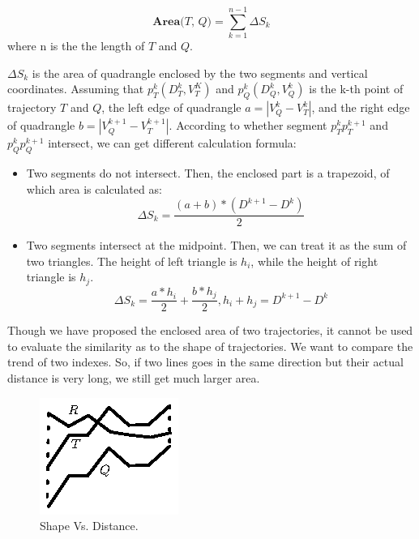 \begin{displaymath}
\textbf{Area($T$, $Q$)} = \sum_{k=1}^{n-1}\Delta S_k	
\end{displaymath}
where n is the the length of $T$ and $Q$.

\textit{$\Delta S_k$} is the area of quadrangle enclosed by the two segments and vertical coordinates. Assuming that $p^k_T(D^k_T, V^K_T)$ and $p^k_Q(D^k_Q, V^k_Q)$ is the k-th point of trajectory $T$ and $Q$, the left edge of quadrangle $a = |V^k_Q - V^k_T|$, and the right edge of quadrangle $b = |V^{k+1}_Q - V^{k+1}_T|$. According to whether segment $p^k_Tp^{k+1}_T$ and $p^k_Qp^{k+1}_Q$ intersect, we can get different calculation formula:   
\begin{itemize}
	\item Two segments do not intersect. Then, the enclosed part is a trapezoid, of which area is calculated as:
\begin{equation}
	\Delta S_k = \frac{(a + b) * (D^{k+1} - D^k)}{2}
\end{equation}
	\item Two segments intersect at the midpoint. Then, we can treat it as the sum of two triangles. The height of left triangle is $h_i$, while the height of right triangle is $h_j$.
\begin{equation}
	\Delta S_k = \frac{a * h_i}{2} + \frac{b * h_j}{2}, h_i + h_j = D^{k+1} - D^k
\end{equation}
\end{itemize} 

Though we have proposed the enclosed area of two trajectories, it cannot be used to evaluate the similarity as to the shape of trajectories.  We want to compare the trend of two indexes. So, if two lines goes in the same direction but their actual distance is very long, we still get much larger area. 

\begin{figure}[!t]
	\centering
	\vspace{-.5em}
	\includegraphics[scale=2]{fig/ShapeOfTrajectory}
	\vspace{-2.5em}
	\caption{Shape Vs. Distance.}
	\label{fig:shape}
	\vspace{-1.5em}
\end{figure}

